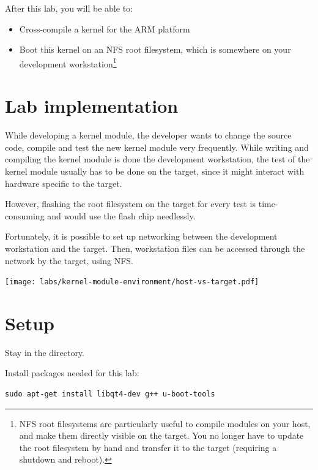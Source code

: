 
After this lab, you will be able to:
\begin{itemize}

\item Cross-compile a kernel for the ARM platform

\item Boot this kernel on an NFS root filesystem, which is somewhere
on your development workstation\footnote{NFS root filesystems are
particularly useful to compile modules on your host, and make them
directly visible on the target. You no longer have to update the root
filesystem by hand and transfer it to the target (requiring a shutdown
and reboot).}

\end{itemize}

\section{Lab implementation}

While developing a kernel module, the developer wants to change the
source code, compile and test the new kernel module very
frequently. While writing and compiling the kernel module is done the
development workstation, the test of the kernel module usually has to
be done on the target, since it might interact with hardware specific
to the target.

However, flashing the root filesystem on the target for every test is
time-consuming and would use the flash chip needlessly.

Fortunately, it is possible to set up networking between the
development workstation and the target. Then, workstation files can be
accessed through the network by the target, using NFS.

\begin{center}
\texttt{[image: labs/kernel-module-environment/host-vs-target.pdf]}
\end{center}

\section{Setup}

Stay in the  directory.

Install packages needed for this lab:

\begin{verbatim}
sudo apt-get install libqt4-dev g++ u-boot-tools
\end{verbatim}

